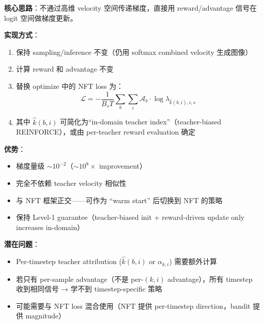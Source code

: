 \documentclass[11pt,a4paper]{article}
\newcommand{\loss}{\mathcal{L}}
\newcommand{\adv}{\mathcal{A}}
\theoremstyle{definition}
\begin{document}
\begin{tcolorbox}[colback=blue!5, colframe=blue!50!black, title=推荐：Solution A (Direct Reward Loss)]
\textbf{核心思路}：不通过高维 velocity 空间传递梯度，直接用 reward/advantage 信号在 logit 空间做梯度更新。

\textbf{实现方式}：
\begin{enumerate}[leftmargin=1.5em]
\item 保持 sampling/inference 不变（仍用 softmax combined velocity 生成图像）
\item 计算 reward 和 advantage 不变
\item 替换 optimize 中的 NFT loss 为：
\begin{equation}
\loss = -\frac{1}{B_s T}\sum_b\sum_i \adv_b \cdot \log\lambda_{\hat{k}(b,i), i, s}
\end{equation}
\item 其中 $\hat{k}(b,i)$ 可简化为``in-domain teacher index''（teacher-biased REINFORCE），或由 per-teacher reward evaluation 确定
\end{enumerate}

\textbf{优势}：
\begin{itemize}[leftmargin=1em]
\item 梯度量级 $\sim 10^{-2}$（$\sim 10^8\times$ improvement）
\item 完全不依赖 teacher velocity 相似性
\item 与 NFT 框架正交——可作为 ``warm start'' 后切换到 NFT 的策略
\item 保持 Level-1 guarantee（teacher-biased init + reward-driven update only increases in-domain）
\end{itemize}

\textbf{潜在问题}：
\begin{itemize}[leftmargin=1em]
\item Per-timestep teacher attribution ($\hat{k}(b,i)$ or $\alpha_{k,i}$) 需要额外计算
\item 若只有 per-sample advantage（不是 per-$(k,i)$ advantage），所有 timestep 收到相同信号 → 学不到 timestep-specific 策略
\item 可能需要与 NFT loss 混合使用（NFT 提供 per-timestep direction，bandit 提供 magnitude）
\end{itemize}
\end{tcolorbox}
\end{document}
